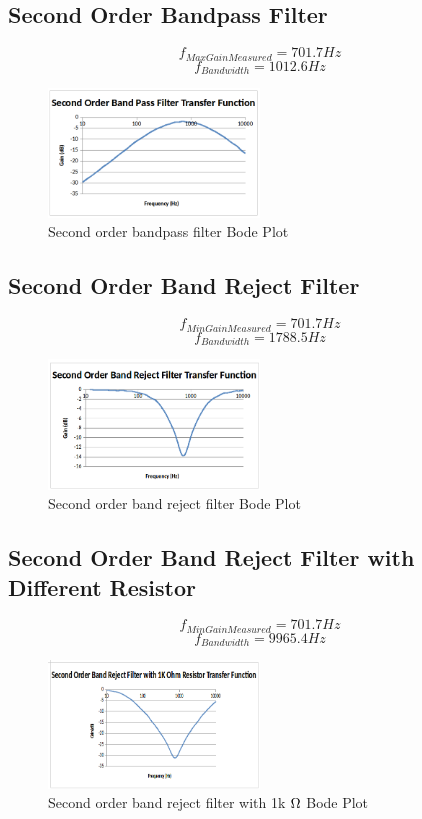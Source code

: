 \documentclass[10pt]{article}
\begin{document}
\subsection*{Second Order Bandpass Filter}
$$f_{MaxGainMeasured} = 701.7 Hz$$
$$f_{Bandwidth} = 1012.6Hz$$
\begin{figure}[H]
	\centering
	\includegraphics[width=0.5\textwidth]{SecondBandPass.png}
	\caption{Second order bandpass filter Bode Plot}
\end{figure}

\subsection*{Second Order Band Reject Filter}
$$f_{MinGainMeasured} = 701.7 Hz$$
$$f_{Bandwidth} = 1788.5Hz$$
\begin{figure}[H]
	\centering
	\includegraphics[width=0.5\textwidth]{SecondReject.png}
	\caption{Second order band reject filter Bode Plot}
\end{figure}

\subsection*{Second Order Band Reject Filter with Different Resistor}
$$f_{MinGainMeasured} = 701.7 Hz$$
$$f_{Bandwidth} = 9965.4Hz$$
\begin{figure}[H]
	\centering
	\includegraphics[width=0.5\textwidth]{SecondReject1k.png}
	\caption{Second order band reject filter with 1k $\ohm$ Bode Plot}
\end{figure}
\end{document}
